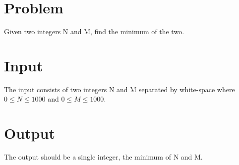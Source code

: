 
\section{Problem}
Given two integers N and M, find the minimum of the two.

\section{Input}
The input consists of two integers N and M separated by white-space where $0 \leq N \leq 1000$ and $0 \leq M \leq 1000$.


\section{Output}
The output should be a single integer, the minimum of N and M.